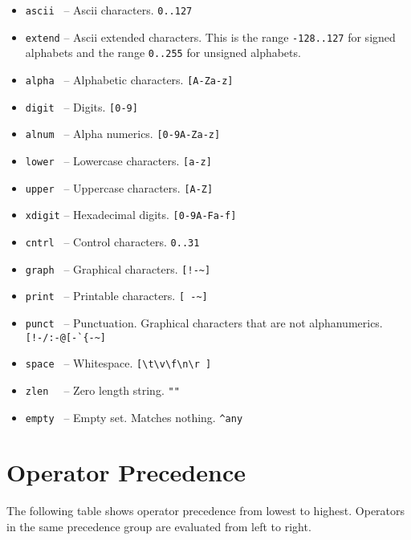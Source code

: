 \documentclass[letterpaper,11pt,oneside]{book}
\begin{document}
\begin{itemize}
\begin{itemize}
\item \verb|ascii | -- Ascii characters. \verb|0..127|

\item \verb|extend| -- Ascii extended characters. This is the range
\verb|-128..127| for signed alphabets and the range \verb|0..255| for unsigned
alphabets.

\item \verb|alpha | -- Alphabetic characters. \verb|[A-Za-z]|

\item \verb|digit | -- Digits. \verb|[0-9]|

\item \verb|alnum | -- Alpha numerics. \verb|[0-9A-Za-z]|

\item \verb|lower | -- Lowercase characters. \verb|[a-z]|

\item \verb|upper | -- Uppercase characters. \verb|[A-Z]|

\item \verb|xdigit| -- Hexadecimal digits. \verb|[0-9A-Fa-f]|

\item \verb|cntrl | -- Control characters. \verb|0..31|

\item \verb|graph | -- Graphical characters. \verb|[!-~]|

\item \verb|print | -- Printable characters. \verb|[ -~]|

\item \verb|punct | -- Punctuation. Graphical characters that are not alphanumerics.
\verb|[!-/:-@[-`{-~]|

\item \verb|space | -- Whitespace. \verb|[\t\v\f\n\r ]|

\item \verb|zlen  | -- Zero length string. \verb|""|

\item \verb|empty | -- Empty set. Matches nothing. \verb|^any|

\end{itemize}
\end{itemize}

\section{Operator Precedence}
The following table shows operator precedence from lowest to highest. Operators
in the same precedence group are evaluated from left to right.
\end{document}
